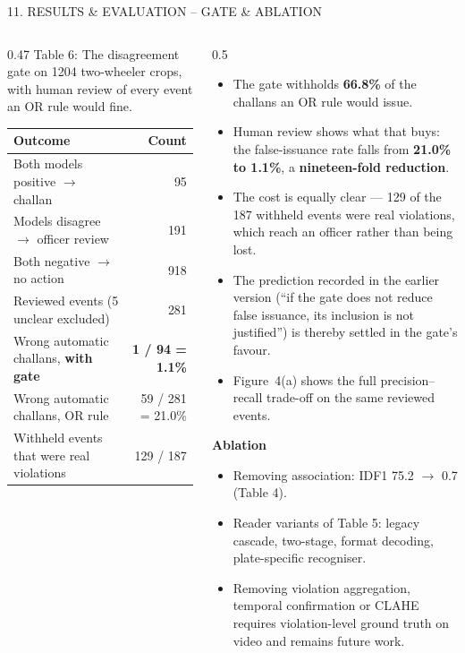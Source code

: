 \documentclass[aspectratio=169,10pt,t]{beamer}
\newcommand{\hd}[1]{{\color{dsblue}\textbf{#1}}}          %
\begin{document}
\begin{frame}{11. RESULTS \& EVALUATION -- GATE \& ABLATION}
\begin{columns}[T,onlytextwidth]
\begin{column}{0.47\textwidth}
\centering
{\tiny Table 6: The disagreement gate on 1204 two-wheeler crops, with human review of every event an OR rule would
fine.}\\[0.2em]
\scriptsize
\begin{tabular}{@{}lr@{}}
\toprule
\textbf{Outcome} & \textbf{Count}\\
\midrule
Both models positive $\rightarrow$ challan & 95\\
Models disagree $\rightarrow$ officer review & 191\\
Both negative $\rightarrow$ no action & 918\\
\midrule
Reviewed events (5 unclear excluded) & 281\\
Wrong automatic challans, \textbf{with gate} & \textbf{1 / 94 = 1.1\%}\\
Wrong automatic challans, OR rule & 59 / 281 = 21.0\%\\
Withheld events that were real violations & 129 / 187\\
\bottomrule
\end{tabular}
\end{column}
\begin{column}{0.5\textwidth}
\scriptsize
\begin{itemize}\setlength{\itemsep}{0.25em}
  \item The gate withholds \textbf{66.8\%} of the challans an OR rule would issue.
  \item Human review shows what that buys: the false-issuance rate falls from \textbf{21.0\% to 1.1\%}, a
        \textbf{nineteen-fold reduction}.
  \item The cost is equally clear --- 129 of the 187 withheld events were real violations, which reach an officer
        rather than being lost.
  \item The prediction recorded in the earlier version (``if the gate does not reduce false issuance, its inclusion
        is not justified'') is thereby settled in the gate's favour.
  \item Figure~4(a) shows the full precision--recall trade-off on the same reviewed events.
\end{itemize}
\hd{\small Ablation}
\begin{itemize}\setlength{\itemsep}{0.15em}
  \item Removing association: IDF1 75.2 $\rightarrow$ 0.7 (Table 4).
  \item Reader variants of Table 5: legacy cascade, two-stage, format decoding, plate-specific recogniser.
  \item Removing violation aggregation, temporal confirmation or CLAHE requires violation-level ground truth on video
        and remains future work.
\end{itemize}
\end{column}
\end{columns}
\end{frame}
\end{document}
